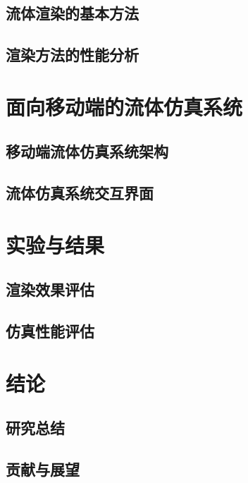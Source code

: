 \section{流体渲染的基本方法}
\section{渲染方法的性能分析}




\chapter{面向移动端的流体仿真系统}

\section{移动端流体仿真系统架构}
\section{流体仿真系统交互界面}



\chapter{实验与结果}

\section{渲染效果评估}
\section{仿真性能评估}


\chapter{结论}

\section{研究总结}
\section{贡献与展望}

